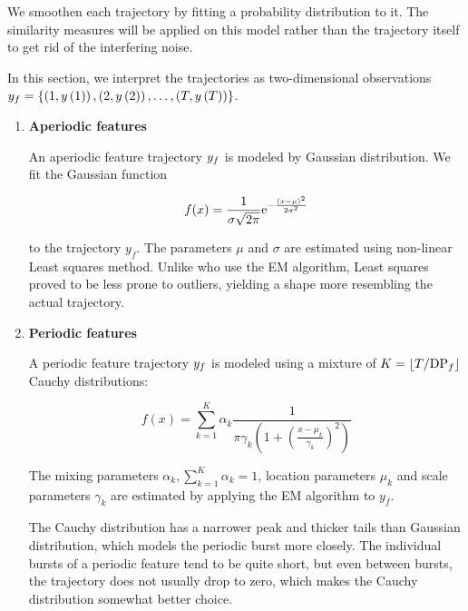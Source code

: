 We smoothen each trajectory by fitting a probability distribution to it. The similarity measures will be applied on this model rather than the trajectory itself to get rid of the interfering noise.

In this section, we interpret the trajectories as two-dimensional observations $y_{f} = \{ \left( 1, y \left(1 \right) \right), \left( 2, y \left(2 \right) \right), \dots, \left( T, y \left(T \right) \right) \}$.

\begin{enumerate}

\item \textbf{Aperiodic features}

An aperiodic feature trajectory $y_{f}$ is modeled by Gaussian distribution. We fit the Gaussian function

\begin{equation*}
	f(x) = \frac{1}{\sigma \sqrt{2 \pi}} \mathrm{e}^{-\frac{\left( x - \mu \right)^{2}}{2 \sigma^{2}}}
\end{equation*}

to the trajectory $y_{f}$. The parameters $\mu$ and $\sigma$ are estimated using non-linear Least squares method. Unlike \cite{event-detection} who use the EM algorithm, Least squares proved to be less prone to outliers, yielding a shape more resembling the actual trajectory.

\item \textbf{Periodic features}

A periodic feature trajectory $y_{f}$ is modeled using a mixture of $K = \lfloor T / \text{DP}_{f}\rfloor$ Cauchy distributions:

\begin{equation*}
	f(x) = \sum_{k = 1}^{K}{\alpha_{k} \frac{1}{\pi \gamma_{k} \left( 1 + \left( \frac{x - \mu_{k}}{\gamma_{k}} \right)^2 \right)}}
\end{equation*}

The mixing parameters $\alpha_{k}, \sum_{k = 1}^{K}{\alpha_{k}} = 1$, location parameters $\mu_{k}$ and scale parameters $\gamma_{k}$ are estimated by applying the EM algorithm to $y_{f}$.

The Cauchy distribution has a narrower peak and thicker tails than Gaussian distribution, which models the periodic burst more closely. The individual bursts of a periodic feature tend to be quite short, but even between bursts, the trajectory does not usually drop to zero, which makes the Cauchy distribution somewhat better choice.

\end{enumerate}


